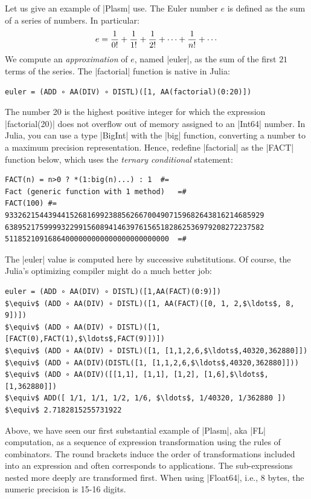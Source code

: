 \begin{script}
Let us give an example of |Plasm| use. The Euler number $e$ is defined as the 
sum of a series of numbers. In particular:
\[
e = {1\over 0!} + {1\over 1!} + {1\over 2!} + \cdots + {1\over n!} + \cdots
\]
We compute an \emph{approximation} of $e$, named |euler|,
as the sum of the first $21$ terms of the series.  The |factorial| function is native in 
Julia:
\begin{lstlisting}[language=JuliaLocal, style=julia, mathescape = true]
    euler = (ADD ∘ AA(DIV) ∘ DISTL)([1, AA(factorial)(0:20)])
\end{lstlisting}
The number 20 is the highest positive integer for which the expression |factorial(20)| does not overflow out of memory assigned to an |Int64| number. In Julia, you can use a type |BigInt| with the |big| function, converting a number to a maximum precision representation. 
Hence, redefine |factorial| as the |FACT| function below, which uses the \emph{ternary conditional} statement:

\begin{lstlisting}[language=JuliaLocal, style=julia, mathescape = true]
FACT(n) = n>0 ? *(1:big(n)...) : 1	#=
Fact (generic function with 1 method)	=#
FACT(100) #=
933262154439441526816992388562667004907159682643816214685929
638952175999932299156089414639761565182862536979208272237582
51185210916864000000000000000000000000	=#
\end{lstlisting}

\begin{coding}
The |euler| value is computed here by successive substitutions. Of course, the
Julia’s optimizing compiler might do a much better job:
\begin{lstlisting}[language=JuliaLocal, style=julia, mathescape = true]
euler = (ADD ∘ AA(DIV) ∘ DISTL)([1,AA(FACT)(0:9)])
$\equiv$ (ADD ∘ AA(DIV) ∘ DISTL)([1, AA(FACT)([0, 1, 2,$\ldots$, 8, 9])])
$\equiv$ (ADD ∘ AA(DIV) ∘ DISTL)([1, [FACT(0),FACT(1),$\ldots$,FACT(9)])])
$\equiv$ (ADD ∘ AA(DIV) ∘ DISTL)([1, [1,1,2,6,$\ldots$,40320,362880]])
$\equiv$ (ADD ∘ AA(DIV)(DISTL([1, [1,1,2,6,$\ldots$,40320,362880]]))
$\equiv$ (ADD ∘ AA(DIV)([[1,1], [1,1], [1,2], [1,6],$\ldots$,[1,362880]])
$\equiv$ ADD([ 1/1, 1/1, 1/2, 1/6, $\ldots$, 1/40320, 1/362880 ])
$\equiv$ 2.7182815255731922
\end{lstlisting}
\end{coding}

Above, we have seen our first substantial example of |Plasm|, aka |FL| computation, as a sequence of expression transformation using the rules of combinators. The round brackets induce the order of transformations included into an expression and often corresponds to applications. The sub-expressions nested
more deeply are transformed first. When using |Float64|, i.e., 8 bytes, the numeric precision is 15-16 digits.


\end{script}
